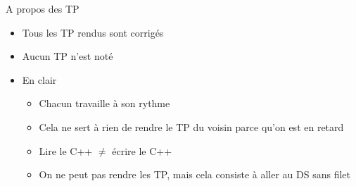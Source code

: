 \begin{frame}{A propos des TP}
   \begin{itemize}
      \item Tous les TP rendus sont corrigés 
      \item Aucun TP n'est noté 
      \item En clair
      \begin{itemize}
         \item Chacun travaille à son rythme
         \item Cela ne sert à rien de rendre le TP du voisin parce qu'on est en retard
         \item Lire le C++ $\neq$ écrire le C++ 
         \item On ne peut pas rendre les TP, mais cela consiste à aller au DS sans filet
      \end{itemize}
   \end{itemize}
\end{frame}
